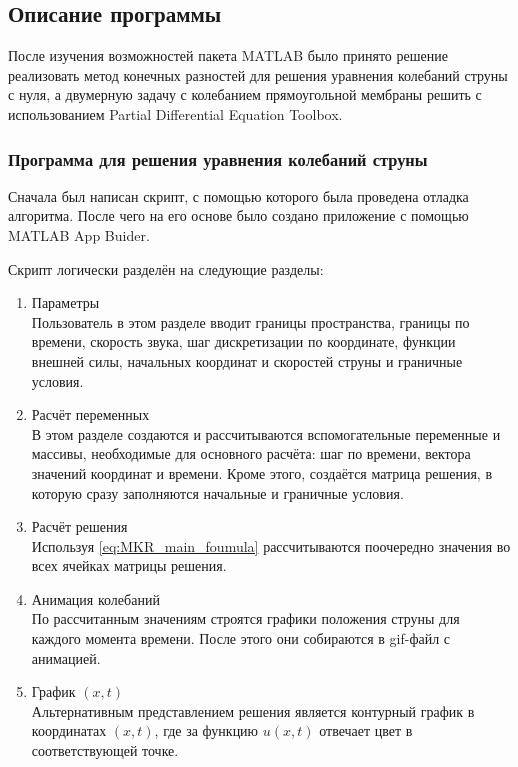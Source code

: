 \documentclass[12pt,a4paper,russian]{report}
\begin{document}
	
	\subsection{Описание программы}
	
	
	После изучения возможностей пакета MATLAB было принято решение реализовать метод конечных разностей для решения уравнения колебаний струны с нуля, а двумерную задачу с колебанием прямоугольной мембраны решить с использованием Partial Differential Equation Toolbox.
	
	\subsubsection{Программа для решения уравнения колебаний струны}
	
	 Сначала был написан скрипт, с помощью которого была проведена отладка алгоритма. После чего на его основе было создано приложение с помощью MATLAB App Buider.
	 
	 Скрипт логически разделён на следующие разделы:
	 \begin{enumerate}
	 	\item Параметры \\
	 	Пользователь в этом разделе вводит границы пространства, границы по времени, скорость звука, шаг дискретизации по координате, функции внешней силы, начальных координат и скоростей струны и граничные условия.
	 	
	 	\item  Расчёт переменных \\
	 	В этом разделе создаются и рассчитываются вспомогательные переменные и массивы, необходимые для основного расчёта: шаг по времени, вектора значений координат и времени. Кроме этого, создаётся матрица решения, в которую сразу заполняются начальные и граничные условия.
	 	
	 	\item  Расчёт решения \\
	 	Используя \eqref{eq:MKR_main_foumula} рассчитываются поочередно значения во всех ячейках матрицы решения.
	 	
	 	\item Анимация колебаний \\
	 	По рассчитанным значениям строятся графики положения струны для каждого момента времени. После этого они собираются в gif-файл с анимацией.
	 	
	 	\item График $(x, t)$ \\
	 	Альтернативным представлением решения является контурный график в координатах $(x, t)$, где за функцию $u(x, t)$ отвечает цвет в соответствующей точке.
	 \end{enumerate}
	 
\end{document}
